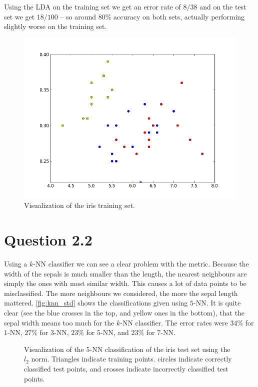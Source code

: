\documentclass[11pt,a4paper]{article}
\begin{document}
Using the LDA on the training set we get an error rate of $8/38$ and on the
test set we get $18/100$ -- so around $80\%$ accuracy on both sets, actually
performing slightly worse on the training set.

\begin{figure}[htbp]
    \centering
    \includegraphics[width=\textwidth]{images/prob21-iristrain.png}
    \caption{Visualization of the iris training set.}
    \label{fig:iris_train}
\end{figure}

\section{Question 2.2}

Using a $k$-NN classifier we can see a clear problem with the metric. Because
the width of the sepals is much smaller than the length, the nearest neighbours
are simply the ones with most similar width. This causes a lot of data points
to be misclassified. The more neighbours we considered, the more the sepal
length mattered. \autoref{fig:knn_std} shows the classifications given using
$5$-NN. It is quite clear (see the blue crosses in the top, and yellow ones in
the bottom), that the sepal width means too much for the $k$-NN classifier.
The error rates were $34\%$ for $1$-NN, $27\%$ for $3$-NN, $23\%$ for $5$-NN,
and $23\%$ for $7$-NN.

\begin{figure}[htbp]
    \centering
    \caption{Visualization of the $5$-NN classification of the iris test set
    using the $l_2$ norm. Triangles indicate training points. circles indicate
    correctly classified test points, and crosses indicate incorrectly classified
    test points.}
    \label{fig:knn_std}
\end{figure}
\end{document}

